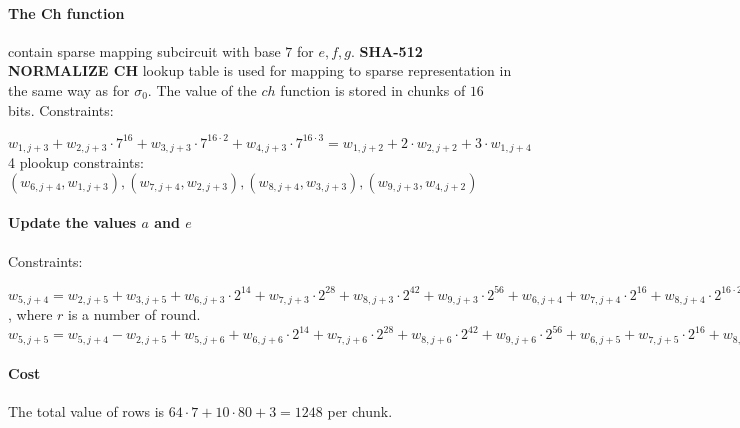\paragraph{The Ch function}
contain sparse mapping subcircuit with base $7$ for $e, f ,g$.
\textbf{SHA-512 NORMALIZE CH} lookup table is used for mapping to sparse representation in the same way as for $\sigma_0$.
The value of the $ch$ function is stored in chunks of $16$ bits.
Constraints:
\begin{center}
    $w_{1, j + 3} + w_{2, j + 3} \cdot 7^{16} + w_{3, j + 3} \cdot 7^{16 \cdot 2} + w_{4, j + 3} \cdot 7^{16 \cdot 3} = w_{1, j + 2} + 2 \cdot w_{2, j + 2} + 3 \cdot w_{1, j + 4}$ \\
    4 plookup constraints: $( w_{6, j + 4}, w_{1, j + 3}), ( w_{7, j + 4}, w_{2, j + 3}), (w_{8, j + 4}, w_{3, j + 3}), (w_{9, j + 3}, w_{4, j + 2})$ \\
\end{center}

\paragraph{Update the values $a$ and $e$}
Constraints:
\begin{center}
    $w_{5, j + 4} = w_{2, j + 5} + w_{3, j + 5} + w_{6, j + 3} \cdot 2^{14} + w_{7, j + 3} \cdot  2^{28} + w_{8, j + 3} \cdot 2^{42} + w_{9, j + 3} \cdot 2^{56} + w_{6, j + 4} + w_{7, j + 4} \cdot 2^{16} + w_{8, j + 4} \cdot 2^{16 \cdot 2} + w_{9, j + 4} \cdot 2^{16 \cdot 3} + k[r] + w_{4, j + 5}$, where $r$ is a number of round. \\
    $w_{5, j + 5} = w_{5, j + 4} - w_{2, j + 5} + w_{5, j + 6} + w_{6, j + 6} \cdot 2^{14} + w_{7, j + 6} \cdot  2^{28} + w_{8, j + 6} \cdot 2^{42} + w_{9, j + 6} \cdot 2^{56} + w_{6, j + 5} + w_{7, j + 5} \cdot 2^{16} + w_{8, j + 5} \cdot 2^{16 \cdot 2} + w_{9, j + 5} \cdot 2^{16 \cdot 3}$
\end{center}

\paragraph{Cost}
The total value of rows is $64 \cdot 7 + 10 \cdot 80 + 3 = 1248$ per chunk.
